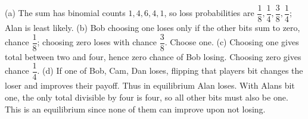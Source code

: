 (a) The sum has binomial counts $1,4,6,4,1$, so loss probabilities are $\dfrac{1}{8},\dfrac{1}{4},\dfrac{3}{8},\dfrac{1}{4}$; Alan is least likely. (b) Bob choosing one loses only if the other bits sum to zero, chance $\dfrac{1}{8}$; choosing zero loses with chance $\dfrac{3}{8}$. Choose one. (c) Choosing one gives total between two and four, hence zero chance of Bob losing. Choosing zero gives chance $\dfrac{1}{4}$. (d) If one of Bob, Cam, Dan loses, flipping that player\textquotesingle s bit changes the loser and improves their payoff. Thus in equilibrium Alan loses. With Alan\textquotesingle s bit one, the only total divisible by four is four, so all other bits must also be one. This is an equilibrium since none of them can improve upon not losing.
